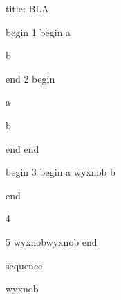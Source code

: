 title: BLA

begin
1
begin
a

b

end
2
begin

a

b

end
end

begin
3
begin
a
wyxnob
b

end

4

5
wyxnobwyxnob
end

sequence

wyxnob

